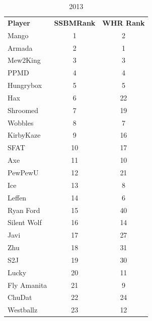 \documentclass[10pt]{article}
\theoremstyle{definition}
\theoremstyle{remark}
\begin{document}
\newpage
\begin{table}[!ht]
    \footnotesize
    
    \parbox{.35 \textwidth}{
        \centering
        \caption{2013}
\begin{tabular}{lcc}
    \textbf{Player} & \textbf{SSBMRank} & \textbf{WHR Rank} \\
    Mango           & 1                      & 2        \\
    Armada          & 2                      & 1        \\
    Mew2King        & 3                      & 3        \\
    PPMD            & 4                      & 4        \\
    Hungrybox       & 5                      & 5        \\
    Hax             & 6                      & 22       \\
    Shroomed        & 7                      & 19       \\
    Wobbles         & 8                      & 7        \\
    KirbyKaze       & 9                      & 16       \\
    SFAT            & 10                     & 17       \\
    Axe             & 11                     & 10       \\
    PewPewU         & 12                     & 21       \\
    Ice             & 13                     & 8        \\
    Leffen          & 14                     & 6        \\
    Ryan Ford       & 15                     & 40       \\
    Silent Wolf     & 16                     & 14       \\
    Javi            & 17                     & 27       \\
    Zhu             & 18                     & 31       \\
    S2J             & 19                     & 30       \\
    Lucky           & 20                     & 11       \\
    Fly Amanita     & 21                     & 9        \\
    ChuDat          & 22                     & 24       \\
    Westballz       & 23                     & 12       \\

\end{tabular}}
\end{table}
\end{document}
